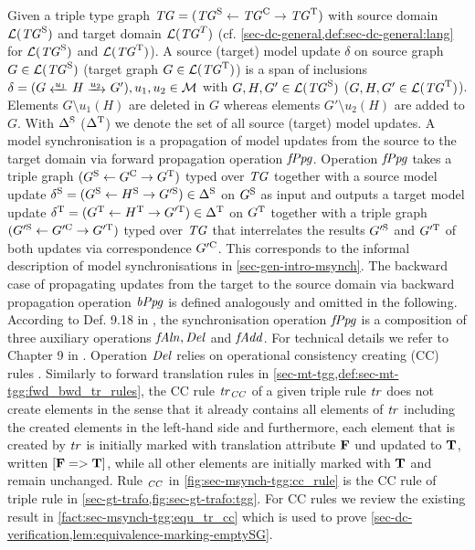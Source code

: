 Given a triple type graph $\mathit{TG}=(\mathit{TG}^\mathrm{S} \gets \mathit{TG}^\mathrm{C} \to \mathit{TG}^\mathrm{T})$ with source domain $\mathcal{L}(\mathit{TG}^\mathrm{S})$ and target domain $\mathcal{L}(\mathit{TG}^T)$ (cf. \cref{sec-dc-general,def:sec-dc-general:lang} for $\mathcal{L}(\mathit{TG}^\mathrm{S})$ and $\mathcal{L}(\mathit{TG}^\mathrm{T})$).
A source (target) model update $\delta$ on source graph $G \in \mathcal{L}(\mathit{TG}^\mathrm{S})$ (target graph $G \in \mathcal{L}(\mathit{TG}^\mathrm{T})$) is a span of inclusions $\delta=(G \transB{u_1} H \trans{u_2} G'),u_1,u_2 \in \M$ with $G,H,G' \in \mathcal{L}(\mathit{TG}^\mathrm{S})$ ($G,H,G' \in \mathcal{L}(\mathit{TG}^\mathrm{T})$).
Elements $G \setminus u_1(H)$ are deleted in $G$ whereas elements $G' \setminus u_2(H)$ are added to $G$.
With $\Delta^\mathrm{S}$ ($\Delta^\mathrm{T}$) we denote the set of all source (target) model updates.
A model synchronisation is a propagation of model updates from the source to the target domain via forward propagation operation $\mathit{fPpg}$.
Operation $\mathit{fPpg}$ takes a triple graph $(G^\mathrm{S} \gets G^\mathrm{C} \to G^\mathrm{T})$ typed over $\mathit{TG}$ together with a source model update $\delta^\SRC=(G^\SRC \gets H^\SRC \to G'^\SRC) \in \Delta^\SRC$ on $G^\mathrm{S}$ as input and outputs a target model update $\delta^\T=(G^\T \gets H^\T \to G'^\T) \in \Delta^\T$ on $G^\mathrm{T}$ together with a triple graph $(G'^\SRC \gets G'^\C \to G'^\T)$ typed over $\mathit{TG}$ that interrelates the results $G'^\SRC$ and $G'^\T$ of both updates via correspondence $G'^\C$.
This corresponds to the informal description of model synchronisations in \cref{sec-gen-intro-msynch}.
The backward case of propagating updates from the target to the source domain via backward propagation operation $\mathit{bPpg}$ is defined analogously and omitted in the following.
According to Def. 9.18 in \cite{FAGT2}, the synchronisation operation $\mathit{fPpg}$ is a composition of three auxiliary operations $\mathit{fAln},\mathit{Del}$ and $\mathit{fAdd}$.
For technical details we refer to Chapter 9 in \cite{FAGT2}.
Operation $\mathit{Del}$ relies on operational consistency creating (CC) rules \cite{DBLP:journals/sosym/0001EOCDXGE15}.
Similarly to forward translation rules in \cref{sec-mt-tgg,def:sec-mt-tgg:fwd_bwd_tr_rules}, the CC rule $\mathit{tr}_\mathit{CC}$ of a given triple rule $\mathit{tr}$ does not create elements in the sense that it already contains all elements of $\mathit{tr}$ including the created elements in the left-hand side and furthermore, each element that is created by $\mathit{tr}$ is initially marked with translation attribute $\mathbf{F}$ und updated to $\mathbf{T}$, written $[\mathbf{F} => \mathbf{T}]$, while all other elements are initially marked with $\mathbf{T}$ and remain unchanged.
Rule $_\mathit{CC}$ in \cref{fig:sec-msynch-tgg:cc_rule} is the CC rule of triple rule  in \cref{sec-gt-trafo,fig:sec-gt-trafo:tgg}.
For CC rules we review the existing result in \cref{fact:sec-msynch-tgg:equ_tr_cc} which is used to prove \cref{sec-dc-verification,lem:equivalence-marking-emptySG}.

